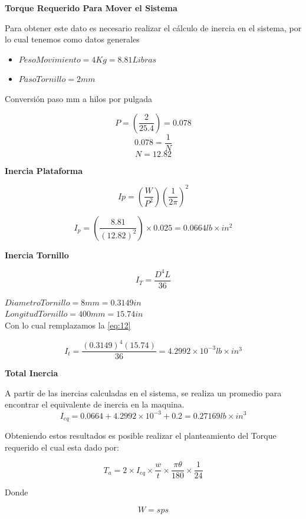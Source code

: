 \textbf{Torque Requerido Para Mover el Sistema}

Para obtener este dato es necesario realizar el cálculo de inercia en el sistema, por lo cual tenemos como datos generales

\begin{itemize}
	\item $Peso Movimiento=4Kg=8.81 Libras$
	\item $Paso Tornillo=2 mm$
\end{itemize}

Conversión paso mm a hilos por pulgada

\[P=(\frac{2}{25.4})=0.078\]
\[0.078=\frac{1}{N}\]
\[N=12.82\]

\textbf{Inercia Plataforma}

\begin{equation}
Ip=(\frac{W}{P^2})(\frac{1}{2\pi })^2
\label{eq:11}
\end{equation}

\[I_p=(\frac{8.81}{(12.82)^2})\times0.025=0.0664 lb\times in^2\]

\textbf{Inercia Tornillo}

\begin{equation}
I_T=\frac{D^4L}{36}
\label{eq:12}
\end{equation}


$Diametro Tornillo= 8mm=0.3149 in$\\
$Longitud Tornillo= 400mm=15.74 in$\\

Con lo cual remplazamos la \autoref{eq:12}

\[I_t=\frac{(0.3149)^4(15.74)}{36}=4.2992\times10^{-3} lb\times in^3\]

\textbf{Total Inercia }

A partir de las inercias calculadas en el sistema, se realiza un promedio para encontrar el equivalente de inercia en la maquina.
\[I_{eq}=0.0664+4.2992\times 10^{-3}+0.2=0.27169 lb\times in^3\]

Obteniendo estos resultados es posible realizar el planteamiento del Torque requerido el cual esta dado por:


\begin{equation}
T_a=2\times I_{eq}\times\frac{w}{t}\times\frac{\pi \theta }{180}\times\frac{1}{24}
\label{eq:13}
\end{equation}

Donde

\begin{equation}
W=sps
\label{eq:13}
\end{equation}

